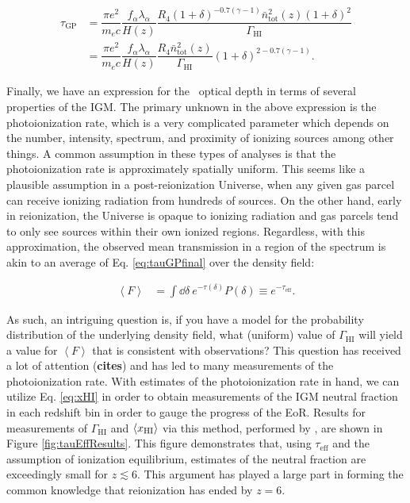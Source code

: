 \begin{align}
\tau_{\text{GP}} &= \dfrac{\pi e^2}{m_e c}\dfrac{f_{\alpha}\lambda_{\alpha}}{H(z)} \dfrac{R_{4}(1+\delta)^{-0.7(\gamma - 1)}\bar{n}_{\text{tot}}^{2}(z)(1+\delta)^2}{\Gamma_{\text{HI}}}\\
&= \dfrac{\pi e^2}{m_e c}\dfrac{f_{\alpha}\lambda_{\alpha}}{H(z)} \dfrac{R_4 \bar{n}_{\text{tot}}^{2}(z)}{\Gamma_{\text{HI}}} (1+\delta)^{2-0.7(\gamma-1)}. \label{eq:tauGPfinal}
\end{align}

Finally, we have an expression for the \lya\ optical depth in terms of several properties of the IGM. The primary unknown in the above expression is the photoionization rate, which is a very complicated parameter which depends on the number, intensity, spectrum, and proximity of ionizing sources among other things. A common assumption in these types of analyses is that the photoionization rate is approximately spatially uniform. This seems like a plausible assumption in a post-reionization Universe, when any given gas parcel can receive ionizing radiation from hundreds of sources. On the other hand, early in reionization, the Universe is opaque to ionizing radiation and gas parcels tend to only see sources within their own ionized regions. Regardless, with this approximation, the observed mean transmission in a region of the spectrum is akin to an average of Eq. \ref{eq:tauGPfinal} over the density field:

\begin{align}
\left\langle F \right\rangle &= \int \dd \delta\ e^{-\tau(\delta)} P(\delta) \equiv e^{-\tau_{\text{eff}}}.
\end{align}


 As such, an intriguing question is, if you have a model for the probability distribution of the underlying density field, what (uniform) value of $\Gamma_{\text{HI}}$ will yield a value for $\left\langle F \right\rangle$ that is consistent with observations? This question has received a lot of attention ({\bf cites}) and has led to many measurements of the photoionization rate. With estimates of the photoionization rate in hand, we can utilize Eq. \ref{eq:xHI} in order to obtain measurements of the IGM neutral fraction in each redshift bin in order to gauge the progress of the EoR. Results for measurements of $\Gamma_{\text{HI}}$ and $\langle x_{\text{HI}}\rangle$ via this method, performed by \cite{Fan2006a}, are shown in Figure \ref{fig:tauEffResults}. This figure demonstrates that, using $\tau_{\text{eff}}$ and the assumption of ionization equilibrium, estimates of the neutral fraction are exceedingly small for $z \lesssim 6$. This argument has played a large part in forming the common knowledge that reionization has ended by $z = 6$. 

